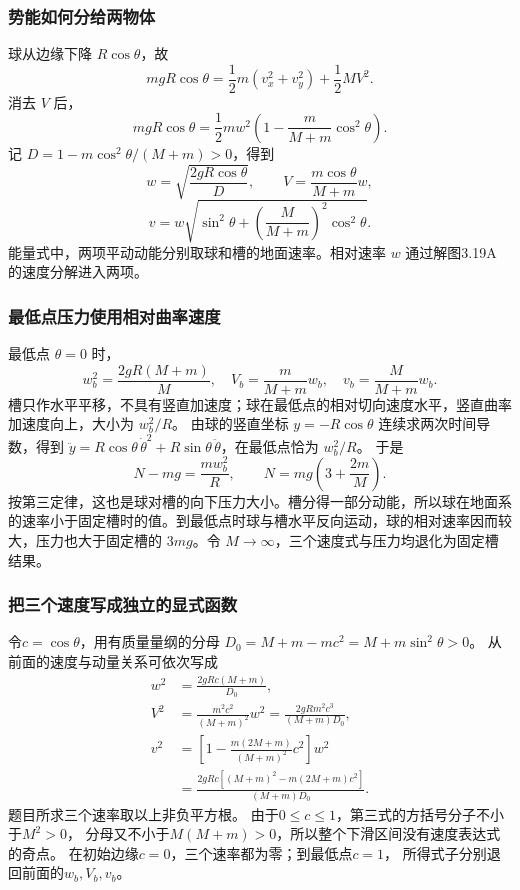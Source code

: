 \documentclass[UTF8,fontset=fandol,a4paper,11pt]{ctexart}
\begin{document}
\subsubsection*{势能如何分给两物体}
球从边缘下降 $R\cos\theta$，故
\[
mgR\cos\theta=\frac12m(v_x^2+v_y^2)+\frac12MV^2.
\]
消去 $V$ 后，
\[
mgR\cos\theta
=\frac12m w^2\left(1-\frac{m}{M+m}\cos^2\theta\right).
\]
记 $D=1-m\cos^2\theta/(M+m)>0$，得到
\[
\boxed{w=\sqrt{\frac{2gR\cos\theta}{D}}},\qquad
\boxed{V=\frac{m\cos\theta}{M+m}w},
\]
\[
\boxed{v=w\sqrt{\sin^2\theta+
\left(\frac{M}{M+m}\right)^2\cos^2\theta}}.
\]
能量式中，两项平动动能分别取球和槽的地面速率。相对速率 $w$ 通过解图3.19A 的速度分解进入两项。

\subsubsection*{最低点压力使用相对曲率速度}
最低点 $\theta=0$ 时，
\[
w_b^2=\frac{2gR(M+m)}{M},\quad
V_b=\frac{m}{M+m}w_b,\quad
v_b=\frac{M}{M+m}w_b.
\]
槽只作水平平移，不具有竖直加速度；球在最低点的相对切向速度水平，竖直曲率加速度向上，大小为 $w_b^2/R$。
由球的竖直坐标 $y=-R\cos\theta$ 连续求两次时间导数，得到
$\ddot y=R\cos\theta\,\dot\theta^2+R\sin\theta\,\ddot\theta$，在最低点恰为 $w_b^2/R$。
于是
\[
N-mg=\frac{mw_b^2}{R},\qquad
\boxed{N=mg\left(3+\frac{2m}{M}\right)}.
\]
按第三定律，这也是球对槽的向下压力大小。槽分得一部分动能，所以球在地面系的速率小于固定槽时的值。到最低点时球与槽水平反向运动，球的相对速率因而较大，压力也大于固定槽的 $3mg$。令 $M\to\infty$，三个速度式与压力均退化为固定槽结果。
\subsubsection*{把三个速度写成独立的显式函数}
令$c=\cos\theta$，用有质量量纲的分母
$D_0=M+m-mc^2=M+m\sin^2\theta>0$。
从前面的速度与动量关系可依次写成
\[
\begin{aligned}
w^2&=\frac{2gRc(M+m)}{D_0},\\
V^2&=\frac{m^2c^2}{(M+m)^2}w^2
=\frac{2gRm^2c^3}{(M+m)D_0},\\
v^2&=\left[1-\frac{m(2M+m)}{(M+m)^2}c^2\right]w^2\\
&=\frac{2gRc[(M+m)^2-m(2M+m)c^2]}{(M+m)D_0}.
\end{aligned}
\]
题目所求三个速率取以上非负平方根。
由于$0\leq c\leq1$，第三式的方括号分子不小于$M^2>0$，
分母又不小于$M(M+m)>0$，所以整个下滑区间没有速度表达式的奇点。
在初始边缘$c=0$，三个速率都为零；到最低点$c=1$，
所得式子分别退回前面的$w_b,V_b,v_b$。
\end{document}

